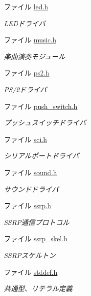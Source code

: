 \begin{DoxyCompactItemize}
ファイル \hyperlink{led_8h}{led.\+h}
\begin{DoxyCompactList}\small\item\em L\+E\+Dドライバ \end{DoxyCompactList}\item 
ファイル \hyperlink{music_8h}{music.\+h}
\begin{DoxyCompactList}\small\item\em 楽曲演奏モジュール \end{DoxyCompactList}\item 
ファイル \hyperlink{ps2_8h}{ps2.\+h}
\begin{DoxyCompactList}\small\item\em P\+S/2ドライバ \end{DoxyCompactList}\item 
ファイル \hyperlink{push__switch_8h}{push\+\_\+switch.\+h}
\begin{DoxyCompactList}\small\item\em プッシュスイッチドライバ \end{DoxyCompactList}\item 
ファイル \hyperlink{sci_8h}{sci.\+h}
\begin{DoxyCompactList}\small\item\em シリアルポートドライバ \end{DoxyCompactList}\item 
ファイル \hyperlink{sound_8h}{sound.\+h}
\begin{DoxyCompactList}\small\item\em サウンドドライバ \end{DoxyCompactList}\item 
ファイル \hyperlink{ssrp_8h}{ssrp.\+h}
\begin{DoxyCompactList}\small\item\em S\+S\+R\+P通信プロトコル \end{DoxyCompactList}\item 
ファイル \hyperlink{ssrp__skel_8h}{ssrp\+\_\+skel.\+h}
\begin{DoxyCompactList}\small\item\em S\+S\+R\+Pスケルトン \end{DoxyCompactList}\item 
ファイル \hyperlink{stddef_8h}{stddef.\+h}
\begin{DoxyCompactList}\small\item\em 共通型、リテラル定義 \end{DoxyCompactList}\item 

\end{DoxyCompactItemize}
